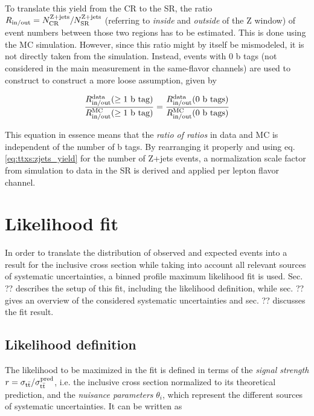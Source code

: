 To translate this yield from the CR to the SR, the ratio $R_{\mathrm{in/out}} = N_{\mathrm{CR}}^{\mathrm{Z+jets}} / N_{\mathrm{SR}}^{\mathrm{Z+jets}}$ (referring to \textit{inside} and \textit{outside} of the Z window) of event numbers between those two regions has to be estimated. This is done using the MC simulation. However, since this ratio might by itself be mismodeled, it is not directly taken from the simulation. Instead, events with 0 b tags (not considered in the main measurement in the same-flavor channels) are used to construct to construct a more loose assumption, given by

\begin{equation}
    \frac{  R_{\mathrm{in/out}}^{\text{data}} ( \geq \text{1 b tag} ) } { R_{\mathrm{in/out}}^{\text{MC}} ( \geq \text{1 b tag} ) } = \frac{  R_{\mathrm{in/out}}^{\text{data}} ( \text{0 b tags} ) } { R_{\mathrm{in/out}}^{\text{MC}} ( \text{0 b tags} ) }
\end{equation}

This equation in essence means that the \textit{ratio of ratios} in data and MC is independent of the number of b tags. By rearranging it properly and using eq. \ref{eq:ttxs:zjets_yield} for the number of Z+jets events, a normalization scale factor from simulation to data in the SR is derived and applied per lepton flavor channel.

\section{Likelihood fit}
\label{sec:ttxs:fit}

In order to translate the distribution of observed and expected events into a result for the inclusive \ttbar cross section while taking into account all relevant sources of systematic uncertainties, a binned profile maximum likelihood fit is used. Sec. ?? describes the setup of this fit, including the likelihood definition, while sec. ?? gives an overview of the considered systematic uncertainties and sec. ?? discusses the fit result.

\subsection{Likelihood definition}

The likelihood to be maximized in the fit is defined in terms of the \textit{signal strength} $r = \sigma_{\mathrm{t \bar{t}}} / \sigma_{\mathrm{t \bar{t}}}^{\text{pred}}$, i.e. the inclusive \ttbar cross section normalized to its theoretical prediction, and the \textit{nuisance parameters} $\theta_i$, which represent the different sources of systematic uncertainties. It can be written as

